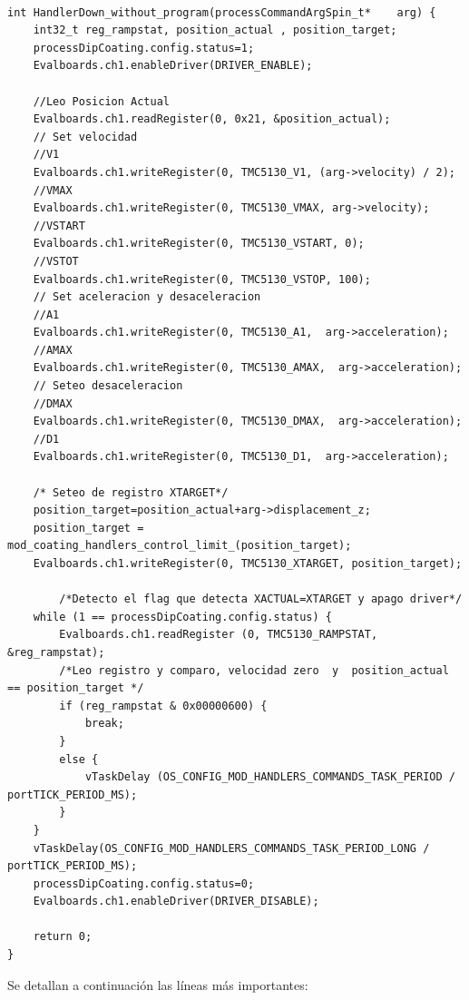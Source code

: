 \begin{lstlisting}[label=cod:vDownCode,caption=Ejecución de comando DOWN.] % 

int HandlerDown_without_program(processCommandArgSpin_t*	arg) {
	int32_t reg_rampstat, position_actual , position_target;
	processDipCoating.config.status=1;
	Evalboards.ch1.enableDriver(DRIVER_ENABLE);

	//Leo Posicion Actual
	Evalboards.ch1.readRegister(0, 0x21, &position_actual);
	// Set velocidad
	//V1
	Evalboards.ch1.writeRegister(0, TMC5130_V1, (arg->velocity) / 2);
	//VMAX
	Evalboards.ch1.writeRegister(0, TMC5130_VMAX, arg->velocity);
	//VSTART
	Evalboards.ch1.writeRegister(0, TMC5130_VSTART, 0);
	//VSTOT
	Evalboards.ch1.writeRegister(0, TMC5130_VSTOP, 100);
	// Set aceleracion y desaceleracion
	//A1
	Evalboards.ch1.writeRegister(0, TMC5130_A1,  arg->acceleration);
	//AMAX
	Evalboards.ch1.writeRegister(0, TMC5130_AMAX,  arg->acceleration);
	// Seteo desaceleracion
	//DMAX
	Evalboards.ch1.writeRegister(0, TMC5130_DMAX,  arg->acceleration);
	//D1
	Evalboards.ch1.writeRegister(0, TMC5130_D1,  arg->acceleration);

	/* Seteo de registro XTARGET*/
	position_target=position_actual+arg->displacement_z;
	position_target = mod_coating_handlers_control_limit_(position_target);
	Evalboards.ch1.writeRegister(0, TMC5130_XTARGET, position_target);

		/*Detecto el flag que detecta XACTUAL=XTARGET y apago driver*/
	while (1 == processDipCoating.config.status) {
		Evalboards.ch1.readRegister (0, TMC5130_RAMPSTAT, &reg_rampstat);
		/*Leo registro y comparo, velocidad zero  y  position_actual == position_target */
		if (reg_rampstat & 0x00000600) {
			break;
		}
		else {
			vTaskDelay (OS_CONFIG_MOD_HANDLERS_COMMANDS_TASK_PERIOD / portTICK_PERIOD_MS);
		}
	}
	vTaskDelay(OS_CONFIG_MOD_HANDLERS_COMMANDS_TASK_PERIOD_LONG / portTICK_PERIOD_MS);
	processDipCoating.config.status=0;
	Evalboards.ch1.enableDriver(DRIVER_DISABLE);

	return 0;
}
\end{lstlisting}

Se detallan a continuación las líneas más importantes:

